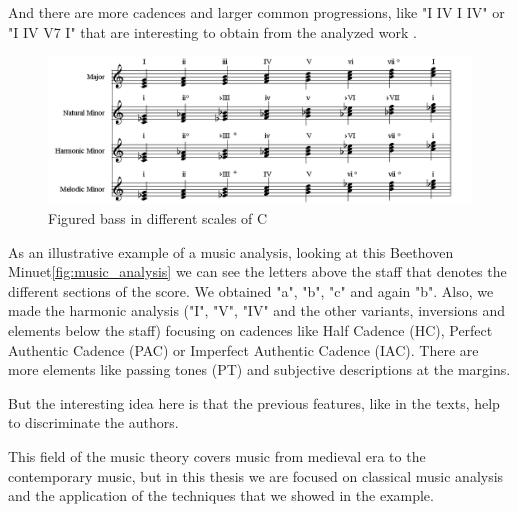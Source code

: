 \documentclass[a4paper,openany,oneside,12pt]{book}
\begin{document}
And there are more cadences and larger common progressions, like "I IV I IV" or "I IV V7 I" that are interesting to obtain from the analyzed work \cite{jacmuse}.

\begin{figure}
\centering
\includegraphics[width=\textwidth]{img/scales.png} 
\caption{Figured bass in different scales of C} \label{fig:scales}
\end{figure}

As an illustrative example of a music analysis, looking at this Beethoven Minuet\ref{fig:music_analysis} we can see the letters above the staff that denotes the different sections of the score. We obtained "a", "b", "c" and again "b". Also, we made the harmonic analysis ("I", "V", "IV" and the other variants, inversions and elements below the staff) focusing on cadences like Half Cadence (HC), Perfect Authentic Cadence (PAC) or Imperfect Authentic Cadence (IAC). There are more elements like passing tones (PT) and subjective descriptions at the margins.

But the interesting idea here is that the previous features, like in the texts, help to discriminate the authors.

This field of the music theory covers music from medieval era to the contemporary music, but in this thesis we are focused on classical music analysis and the application of the techniques that we showed in the example.
\end{document}
